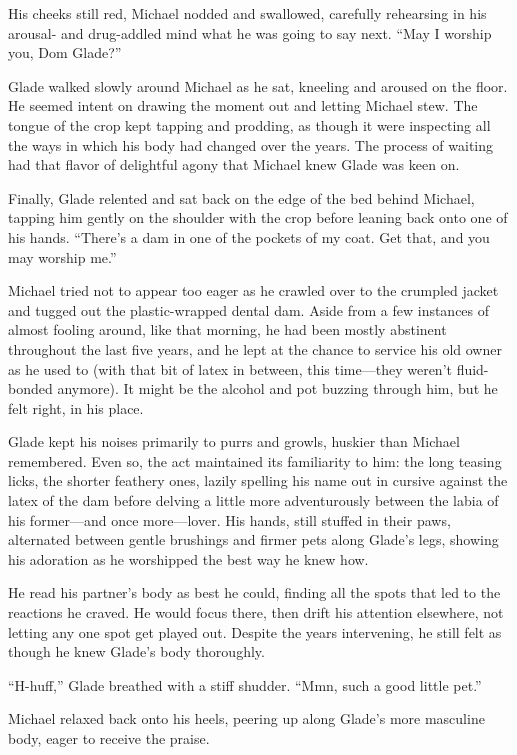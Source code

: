 His cheeks still red, Michael nodded and swallowed, carefully rehearsing in his arousal- and drug-addled mind what he was going to say next. ``May I worship you, Dom Glade?''

Glade walked slowly around Michael as he sat, kneeling and aroused on the floor. He seemed intent on drawing the moment out and letting Michael stew. The tongue of the crop kept tapping and prodding, as though it were inspecting all the ways in which his body had changed over the years. The process of waiting had that flavor of delightful agony that Michael knew Glade was keen on.

Finally, Glade relented and sat back on the edge of the bed behind Michael, tapping him gently on the shoulder with the crop before leaning back onto one of his hands. ``There's a dam in one of the pockets of my coat. Get that, and you may worship me.''

Michael tried not to appear too eager as he crawled over to the crumpled jacket and tugged out the plastic-wrapped dental dam. Aside from a few instances of almost fooling around, like that morning, he had been mostly abstinent throughout the last five years, and he lept at the chance to service his old owner as he used to (with that bit of latex in between, this time---they weren't fluid-bonded anymore). It might be the alcohol and pot buzzing through him, but he felt right, in his place.

Glade kept his noises primarily to purrs and growls, huskier than Michael remembered. Even so, the act maintained its familiarity to him: the long teasing licks, the shorter feathery ones, lazily spelling his name out in cursive against the latex of the dam before delving a little more adventurously between the labia of his former---and once more---lover. His hands, still stuffed in their paws, alternated between gentle brushings and firmer pets along Glade's legs, showing his adoration as he worshipped the best way he knew how.

He read his partner's body as best he could, finding all the spots that led to the reactions he craved. He would focus there, then drift his attention elsewhere, not letting any one spot get played out. Despite the years intervening, he still felt as though he knew Glade's body thoroughly.

``H-huff,'' Glade breathed with a stiff shudder. ``Mmn, such a good little pet.''

Michael relaxed back onto his heels, peering up along Glade's more masculine body, eager to receive the praise.

